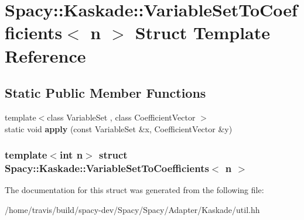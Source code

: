 \hypertarget{structSpacy_1_1Kaskade_1_1VariableSetToCoefficients}{\section{\-Spacy\-:\-:\-Kaskade\-:\-:\-Variable\-Set\-To\-Coefficients$<$ n $>$ \-Struct \-Template \-Reference}
\label{structSpacy_1_1Kaskade_1_1VariableSetToCoefficients}
}
\subsection*{\-Static \-Public \-Member \-Functions}
\begin{DoxyCompactItemize}
\item 
\hypertarget{structSpacy_1_1Kaskade_1_1VariableSetToCoefficients_a141fc5818b45f0fbeeca73a37cfff841}{{\footnotesize template$<$class Variable\-Set , class Coefficient\-Vector $>$ }\\static void {\bfseries apply} (const \-Variable\-Set \&x, \-Coefficient\-Vector \&y)}\label{structSpacy_1_1Kaskade_1_1VariableSetToCoefficients_a141fc5818b45f0fbeeca73a37cfff841}

\end{DoxyCompactItemize}
\subsubsection*{template$<$int n$>$ struct Spacy\-::\-Kaskade\-::\-Variable\-Set\-To\-Coefficients$<$ n $>$}



\-The documentation for this struct was generated from the following file\-:\begin{DoxyCompactItemize}
\item 
/home/travis/build/spacy-\/dev/\-Spacy/\-Spacy/\-Adapter/\-Kaskade/util.\-hh\end{DoxyCompactItemize}
